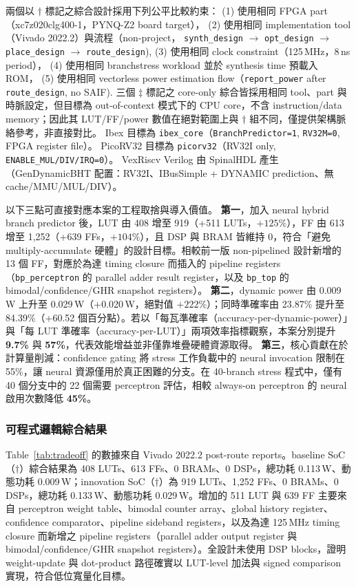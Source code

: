 \documentclass[12pt,a4paper]{article}
\begin{document}
	兩個以 $\dagger$ 標記之綜合設計採用下列公平比較約束：
	(1) 使用相同 FPGA part（xc7z020clg400-1，PYNQ-Z2 board target），
	(2) 使用相同 implementation tool（Vivado 2022.2）與流程（non-project，
	\texttt{synth\_design} $\rightarrow$ \texttt{opt\_design} $\rightarrow$
	\texttt{place\_design} $\rightarrow$ \texttt{route\_design}),
	(3) 使用相同 clock constraint（125\,MHz，8\,ns period），
	(4) 使用相同 branchstress workload 並於 synthesis time 預載入 ROM，
	(5) 使用相同 vectorless power estimation flow（\texttt{report\_power} after
	\texttt{route\_design}, no SAIF).
	三個 $\ddagger$ 標記之 core-only 綜合皆採用相同 tool、part 與時脈設定，但目標為 out-of-context 模式下的 CPU core，不含 instruction/data memory；因此其 LUT/FF/power 數值在絕對範圍上與 $\dagger$ 組不同，僅提供架構脈絡參考，非直接對比。
	Ibex 目標為 \texttt{ibex\_core}（\texttt{BranchPredictor=1}, \texttt{RV32M=0}, FPGA register file）。
	PicoRV32 目標為 \texttt{picorv32}（RV32I only, \texttt{ENABLE\_MUL/DIV/IRQ=0}）。
	VexRiscv Verilog 由 SpinalHDL 產生（GenDynamicBHT 配置：RV32I、IBusSimple + DYNAMIC prediction、無 cache/MMU/MUL/DIV）。

	以下三點可直接對應本案的工程取捨與導入價值。
	\textbf{第一}，加入 neural hybrid branch predictor 後，LUT 由 408 增至 919（+511 LUTs，\(+125\%\)），FF 由 613 增至 1{,}252（+639 FFs，\(+104\%\)），且 DSP 與 BRAM 皆維持 0，符合「避免 multiply-accumulate 硬體」的設計目標。相較前一版 non-pipelined 設計新增的 13 個 FF，對應於為達 timing closure 而插入的 pipeline registers（\texttt{bp\_perceptron} 的 parallel adder result register，以及 \texttt{bp\_top} 的 bimodal/confidence/GHR snapshot registers）。
	\textbf{第二}，dynamic power 由 0.009\,W 上升至 0.029\,W（+0.020\,W，絕對值 \(+222\%\)）；同時準確率由 23.87\% 提升至 84.39\%（+60.52 個百分點）。若以「每瓦準確率（accuracy-per-dynamic-power）」與「每 LUT 準確率（accuracy-per-LUT）」兩項效率指標觀察，本案分別提升 \textbf{9.7\%} 與 \textbf{57\%}，代表效能增益並非僅靠堆疊硬體資源取得。
	\textbf{第三}，核心貢獻在於計算量削減：confidence gating 將 stress 工作負載中的 neural invocation 限制在 55\%，讓 neural 資源僅用於真正困難的分支。在 40-branch stress 程式中，僅有 40 個分支中的 22 個需要 perceptron 評估，相較 always-on perceptron 的 neural 啟用次數降低 \textbf{45\%}。

	\subsubsection{可程式邏輯綜合結果}

	Table~\ref{tab:tradeoff} 的數據來自 Vivado 2022.2 post-route reports。baseline SoC（$\dagger$）綜合結果為 408 LUTs、613 FFs、0 BRAMs、0 DSPs，總功耗 0.113\,W、動態功耗 0.009\,W；innovation SoC（$\dagger$）為 919 LUTs、1{,}252 FFs、0 BRAMs、0 DSPs，總功耗 0.133\,W、動態功耗 0.029\,W。增加的 511 LUT 與 639 FF 主要來自 perceptron weight table、bimodal counter array、global history register、confidence comparator、pipeline sideband registers，以及為達 125\,MHz timing closure 而新增之 pipeline registers（parallel adder output register 與 bimodal/confidence/GHR snapshot registers）。全設計未使用 DSP blocks，證明 weight-update 與 dot-product 路徑確實以 LUT-level 加法與 signed comparison 實現，符合低位寬量化目標。
\end{document}
